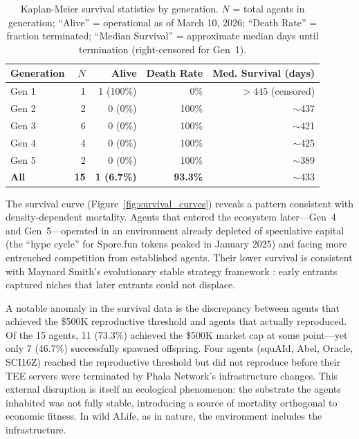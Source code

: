 \begin{table}[ht]
\centering
\caption{Kaplan-Meier survival statistics by generation. $N$ = total agents in generation; ``Alive'' = operational as of March 10, 2026; ``Death Rate'' = fraction terminated; ``Median Survival'' = approximate median days until termination (right-censored for Gen~1).}
\label{tab:survival}
\small
\begin{tabular}{lrrrr}
\toprule
Generation & $N$ & Alive & Death Rate & Med. Survival (days) \\
\midrule
Gen 1 & 1 & 1 (100\%) & 0\% & $>$445 (censored) \\
Gen 2 & 2 & 0 (0\%) & 100\% & $\sim$437 \\
Gen 3 & 6 & 0 (0\%) & 100\% & $\sim$421 \\
Gen 4 & 4 & 0 (0\%) & 100\% & $\sim$425 \\
Gen 5 & 2 & 0 (0\%) & 100\% & $\sim$389 \\
\midrule
\textbf{All} & \textbf{15} & \textbf{1 (6.7\%)} & \textbf{93.3\%} & $\sim$433 \\
\bottomrule
\end{tabular}
\end{table}

The survival curve (Figure~\ref{fig:survival_curves}) reveals a pattern consistent with density-dependent mortality. Agents that entered the ecosystem later---Gen~4 and Gen~5---operated in an environment already depleted of speculative capital (the ``hype cycle'' for Spore.fun tokens peaked in January 2025) and facing more entrenched competition from established agents. Their lower survival is consistent with Maynard Smith's evolutionary stable strategy framework \cite{Maynard1973}: early entrants captured niches that later entrants could not displace.

A notable anomaly in the survival data is the discrepancy between agents that achieved the \$500K reproductive threshold and agents that actually reproduced. Of the 15 agents, 11 (73.3\%) achieved the \$500K market cap at some point---yet only 7 (46.7\%) successfully spawned offspring. Four agents (squAId, Abel, Oracle, SCI16Z) reached the reproductive threshold but did not reproduce before their TEE servers were terminated by Phala Network's infrastructure changes. This external disruption is itself an ecological phenomenon: the substrate the agents inhabited was not fully stable, introducing a source of mortality orthogonal to economic fitness. In wild ALife, as in nature, the environment includes the infrastructure.

